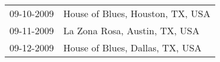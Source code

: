 \begin{supertabular}{ll}
 09-10-2009 &  House of Blues, Houston, TX, USA \\
 09-11-2009 &     La Zona Rosa, Austin, TX, USA \\
 09-12-2009 &   House of Blues, Dallas, TX, USA \\
\end{supertabular}
